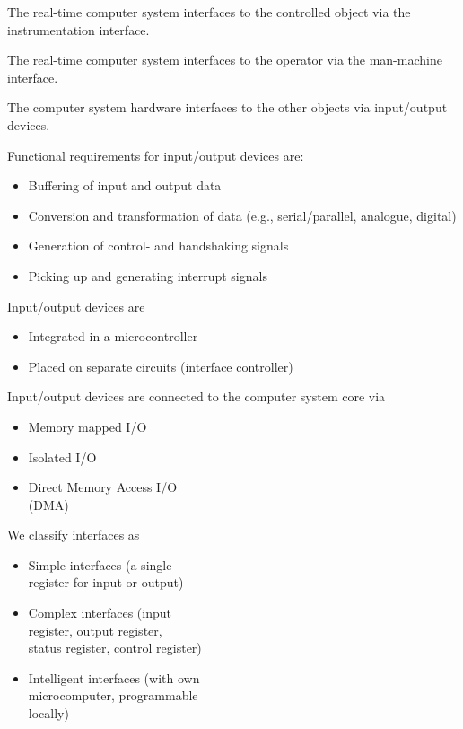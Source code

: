 The real-time computer system interfaces to the controlled object via
the instrumentation interface.

The real-time computer system interfaces to the operator via the
man-machine interface.

The computer system hardware interfaces to the other objects via
input/output devices.

Functional requirements for input/output devices are:

\begin{itemize}
\item
  Buffering of input and output data
\item
  Conversion and transformation of data (e.g., serial/parallel,
  analogue, digital)
\item
  Generation of control- and handshaking signals
\item
  Picking up and generating interrupt signals
\end{itemize}

Input/output devices are

\begin{itemize}
\item
  Integrated in a microcontroller
\item
  Placed on separate circuits (interface controller)
\end{itemize}

Input/output devices are connected to the computer system core via

\begin{itemize}
\item
  Memory mapped I/O
\item
  Isolated I/O
\item
  Direct Memory Access I/O\\
  (DMA)
\end{itemize}

We classify interfaces as

\begin{itemize}
\item
  Simple interfaces (a single\\
  register for input or output)
\item
  Complex interfaces (input\\
  register, output register,\\
  status register, control register)
\item
  Intelligent interfaces (with own\\
  microcomputer, programmable\\
  locally)
\end{itemize}

